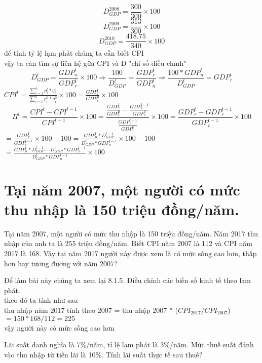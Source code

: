 \begin{enumerate}[a.]
        $$D^{2008}_{GDP} = \frac{300}{300} \times 100$$
        $$D^{2009}_{GDP} = \frac{313}{300} \times 100$$
        $$D^{2010}_{GDP} = \frac{418.75}{340} \times 100$$ 
        để tính tỷ lệ lạm phát chúng ta cần biết CPI\\
        vậy ta càn tìm sự liên hệ gữa CPI và D "chỉ số điều chỉnh"\\
        $$D^t_{GDP} = \frac{GDP^t_n}{GDP^t_r} \times 100 \Rightarrow \frac{100}{D^t_{GDP}} = \frac{GDP^t_r}{GDP^t_n} \Rightarrow \frac{100 * GDP^t_n}{D^t_{GDP}} = GDP^t_r $$
        $CPI^t = \frac{\sum^{n}_{i=1}p^t_i * q^0_i}{\sum^{n}_{i=1}p^0_i * q^0_i} \times 100 = \frac{GDP^t_r}{GDP^0_r}  \times 100 $\\
        \[\Pi^t = \frac{CPI^t - CPI^{t -1}}{CPI^{t -1}} \times 100 = \frac{\frac{GDP^t_r}{GDP^0_r} - \frac{GDP^{t-1}_r}{GDP^0_r}}{\frac{GDP^{t-1}_r}{GDP^0_r}} \times 100 = \frac{GDP^t_r - GDP^{t-1}_r}{GDP^{t-1}_r} \times 100\]
        $ = \frac{GDP^t_r}{GDP^{t-1}_r} \times 100 - 100 = \frac{GDP^t_n * D^{t-1}_{GDP}}{D^t_{GDP}* GDP^{t-1}_n} \times 100 - 100$\\
        $ = \frac{GDP^t_n * D^{t-1}_{GDP} - D^t_{GDP}* GDP^{t-1}_n }{D^t_{GDP}* GDP^{t-1}_n} \times 100$


\end{enumerate}


\section{Tại năm 2007, một người có mức thu nhập là 150 triệu đồng/năm.}
Tại năm 2007, một người có mức thu nhập là 150 triệu đồng/năm. Năm 2017 thu nhập 
của anh ta là 255 triệu đồng/năm. Biết CPI năm 2007 là 112 và CPI năm 2017 là 168. Vậy tại 
năm 2017 người này được xem là có mức sống cao hơn, thấp hơn hay tương đương với năm 
2007?

Để làm bài này chúng ta xem lại 8.1.5. Điều chỉnh các biến số kinh tế 
theo lạm phát.\\
theo đó ta tính như sau\\
thu nhập năm 2017 tính theo 2007 = thu nhập 2007 * ($CPI_{2017}/CPI_{2007}$)\\
$= 150 * 168 / 112 = 225$\\
vậy người này có mức sống cao hơn

Lãi suất danh nghĩa là 7$\%$/năm, tỉ lệ lạm phát là 3\%/năm. Mức thuế suất đánh vào 
thu nhập từ tiền lãi là 10\%. Tính lãi suất thực tế sau thuế?

